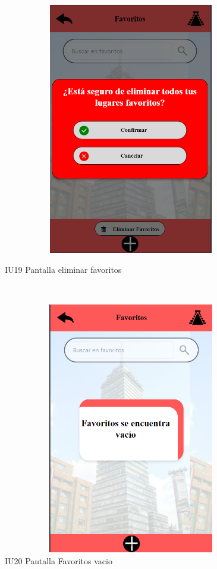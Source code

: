 \begin{figure}[htb]
        \begin{minipage}{1\textwidth}
        \centering
        \includegraphics[width=17cm, height=11cm]{front/PANTALLAS FUNCIONALES 3 DICIEMBRE/IU19_Pantalla eliminar favoritos.png}
        \caption{IU19 Pantalla eliminar favoritos}
    \end{minipage}%
    \\
        \begin{minipage}{1\textwidth}
        \centering
        \includegraphics[width=17cm, height=11cm]{front/PANTALLAS FUNCIONALES 3 DICIEMBRE/IU20_Pantalla Favoritos vacio.png}
        \caption{IU20 Pantalla Favoritos vacio}
    \end{minipage}%
\end{figure}

